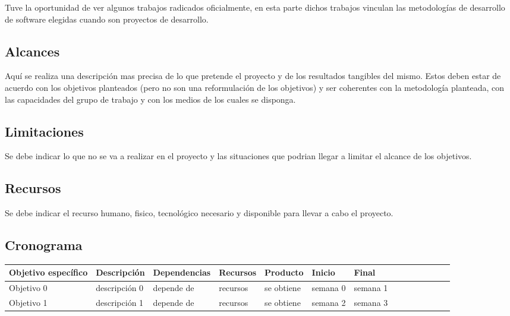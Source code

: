 \documentclass[a4paper, 11pt, oneside]{article}
\theoremstyle{definition}
\theoremstyle{remark}
\begin{document}
Tuve la oportunidad de ver algunos trabajos radicados oficialmente, en esta parte dichos trabajos
vinculan las metodologías de desarrollo de software elegidas cuando son proyectos de desarrollo.
\clearpage


\begin{center}
\section{Alcances}
\end{center}
Aquí se realiza una descripción mas precisa de lo que pretende el proyecto y de los resultados
tangibles del mismo.  Estos deben estar de acuerdo con los objetivos planteados (pero no son una
reformulación de los objetivos) y ser coherentes con la metodología planteada, con las capacidades
del grupo de trabajo y con los medios de los cuales se disponga.
\clearpage

\begin{center}
\section{Limitaciones}
\end{center}
Se debe indicar lo que no se va a realizar en el proyecto y las situaciones que podrian llegar a
limitar el alcance de los objetivos.
\clearpage

\begin{center}
\section{Recursos}
\end{center}
Se debe indicar el recurso humano, fisico, tecnológico necesario y disponible para llevar a cabo el
proyecto.
\clearpage

\begin{sidewaystable}
\begin{center}
\section{Cronograma}
\end{center}


\begin{center}

\begin{tabular}{l p{4cm} l p{4cm} l p{2cm} l p{2cm} l p{2cm} c p{2cm} c p{2cm} }
\toprule
\rowcolor[gray]{0.9}Objetivo específico & Descripción & Dependencias & Recursos  & Producto &
Inicio & Final \\
\midrule
Objetivo 0 & descripción 0 & depende de & recursos & se obtiene & semana 0 & semana 1 \\
\midrule
Objetivo 1 & descripción 1 & depende de & recursos & se obtiene & semana 2 & semana 3 \\
\bottomrule
\end{tabular}

\end{center}
\end{sidewaystable}
\clearpage
\end{document}
